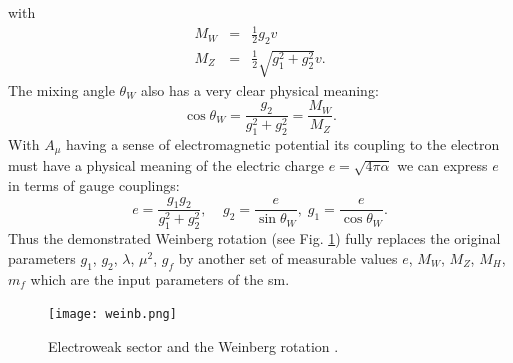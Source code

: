 with
\begin{equation}
\begin{array}{lll} 
M_W &= & \frac{1}{2} g_2 v\\ 
M_Z &=& \frac{1}{2} \sqrt{g_1^2+g_2^2} v.
\end{array} 
\end{equation}
The mixing angle $\theta_W$ also has a very clear physical meaning:
\begin{equation}
\cos{\theta_W}=\frac{g_2}{g_1^2+g_2^2}=\frac{M_W}{M_Z}.
\end{equation}
With $A_{\mu}$ having a sense of electromagnetic potential its coupling to the electron must have a physical meaning of the electric charge $e=\sqrt{4\pi\alpha}$ we can express $e$ in terms of gauge couplings:
\begin{equation}
e=\frac{g_1 g_2}{g_1^2+g_2^2}, \;\;\;\;g_2=\frac{e}{\sin{\theta_W}},\;g_1=\frac{e}{\cos{\theta_W}} .
\end{equation}
Thus the demonstrated Weinberg rotation (see Fig. \ref{fig::weiberg_rotation}) fully replaces the original parameters $g_1$, $g_2$, $\lambda$, $\mu^2$, $g_f$ by another set of measurable values $e$, $M_W$, $M_Z$, $M_H$, $m_f$ which are the input parameters of the \gls{sm}.


\begin{figure}[htpb]
	\centering
	\texttt{[image: weinb.png]}
	\caption{Electroweak sector and the Weinberg rotation \cite{coupl_wiki}. }
	\label{fig::weiberg_rotation}
\end{figure}

